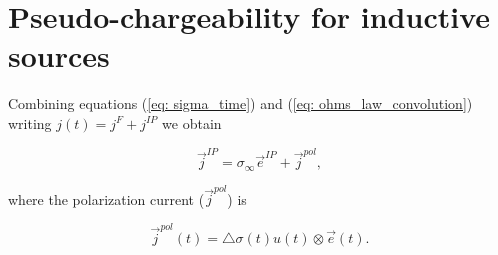 \documentclass[extra,mreferee]{gji}
\newcommand{\siginf}{\sigma_\infty}
\newcommand{\dsig}{\triangle\sigma}
\renewcommand {\j}  { {\vec j} }
\newcommand {\e}  { {\vec e} }
\begin{document}
\section{Pseudo-chargeability for inductive sources}
Combining equations (\ref{eq: sigma_time}) and  (\ref{eq: ohms_law_convolution}) writing $j(t)=j^F + j^{IP}$ we obtain
\begin{linenomath*}
\begin{equation}
  \j^{IP} = \siginf \e^{IP} + \j^{pol},
  \label{eq:IP_current}
\end{equation}
\end{linenomath*}
where the polarization current ($\j^{pol}$) is
\begin{linenomath*}
\begin{equation}
  \j^{pol}(t) = \dsig(t)u(t) \otimes \e(t).
  \label{eq:polarization_current}
\end{equation}
\end{linenomath*}
\end{document}
